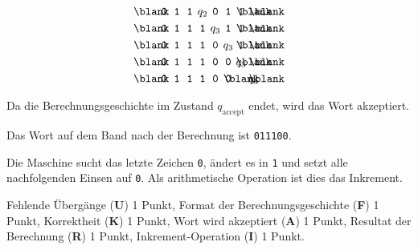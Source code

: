 \begin{loesung}
\begin{teilaufgaben}
\begin{align*}
&\z{\blank} \zt{0}  \zt{1}  \zt{1}  \z{q_2} \zt{0}  \zt{1}  \zt{1}  \zb  \zb\\
&\z{\blank} \zt{0}  \zt{1}  \zt{1}  \zt{1}  \z{q_3} \zt{1}  \zt{1}  \zb  \zb\\
&\z{\blank} \zt{0}  \zt{1}  \zt{1}  \zt{1}  \zt{0}  \z{q_3} \zt{1}  \zb  \zb\\
&\z{\blank} \zt{0}  \zt{1}  \zt{1}  \zt{1}  \zt{0}  \zt{0}  \z{q_3} \zb  \zb\\
&\z{\blank} \zt{0}  \zt{1}  \zt{1}  \zt{1}  \zt{0}  \zt{0}  \zb  \z{q_a} \zb\\
\end{align*}
\egroup
\item
Da die Berechnungsgeschichte im Zustand $q_{\text{accept}}$ endet,
wird das Wort akzeptiert.
\item
Das Wort auf dem Band nach der Berechnung ist \texttt{011100}.
\item
Die Maschine sucht das letzte Zeichen \texttt{0}, ändert es in \texttt{1}
und setzt alle nachfolgenden Einsen auf \texttt{0}.
Als arithmetische Operation ist dies das Inkrement.
\qedhere
\end{teilaufgaben}
\end{loesung}

\begin{bewertung}
Fehlende Übergänge ({\bf U}) 1 Punkt,
Format der Berechnungsgeschichte  ({\bf F}) 1 Punkt,
Korrektheit ({\bf K}) 1 Punkt,
Wort wird akzeptiert ({\bf A}) 1 Punkt,
Resultat der Berechnung ({\bf R}) 1 Punkt,
Inkrement-Operation ({\bf I}) 1 Punkt.
\end{bewertung}
